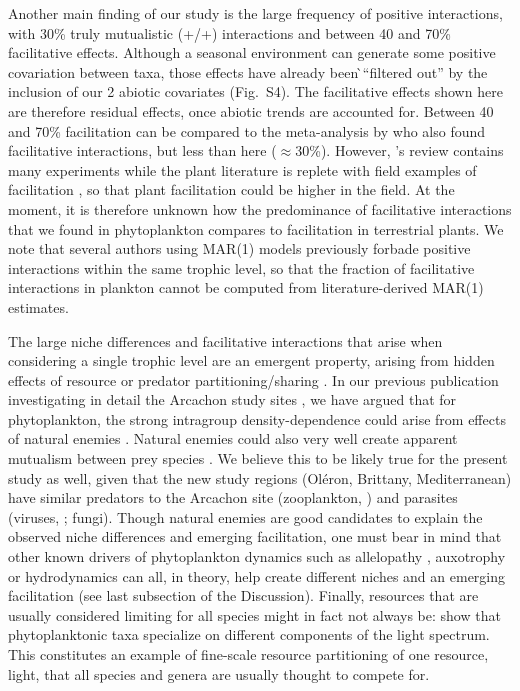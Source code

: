 \documentclass[10pt]{article}
\begin{document}
Another main finding of our study is the large frequency of positive
interactions, with 30\% truly mutualistic (+/+) interactions and between
40 and 70\% facilitative effects. Although a seasonal environment can generate some positive covariation between taxa, those effects have already been ̀``filtered out'' by the inclusion of our 2 abiotic covariates (Fig.~S4). The facilitative effects shown here are therefore residual effects, once abiotic trends are accounted for. Between 40 and 70\% facilitation can be compared to the
meta-analysis by \citet{adler_competition_2018} who also found facilitative
interactions, but less than here ($\approx$30\%). However, \citet{adler_competition_2018}'s
review contains many experiments while the plant literature is replete
with field examples of facilitation \citep{brooker_facilitation_2008,mcintire2014facilitation},
so that plant facilitation could be higher in the field. At the moment,
it is therefore unknown how the predominance of facilitative interactions
that we found in phytoplankton compares to facilitation in terrestrial
plants. We note that several authors using MAR(1) models previously
forbade positive interactions within the same trophic level, so that
the fraction of facilitative interactions in plankton cannot be computed
from literature-derived MAR(1) estimates.

The large niche differences and facilitative interactions that arise
when considering a single trophic level are an emergent property,
arising from hidden effects of resource or predator partitioning/sharing
\citep{chesson_updates_2018}. In our previous publication investigating
in detail the Arcachon study sites \citep{barraquand_coastal_2018},
we have argued that for phytoplankton, the strong intragroup density-dependence
could arise from effects of natural enemies \citep{haydon_pivotal_1994}.
Natural enemies could also very well create apparent mutualism between
prey species \citep{abrams_apparent_1998,barraquand_indirect_2015,de_ruiter_emergent_2017}.
We believe this to be likely true for the present study as well, given
that the new study regions (Oléron, Brittany, Mediterranean) have
similar predators to the Arcachon site (zooplankton, \citealp[e.g.,][]{jamet_zooplankton_2001,moderan_zooplankton_2010,tortajada_network_2012})
and parasites (viruses, \citealp[e.g.,][]{ory_pelagic_2010};
fungi). Though natural enemies are good candidates to explain the
observed niche differences and emerging facilitation, one must bear
in mind that other known drivers of phytoplankton dynamics such as
allelopathy \citep{felpeto_allelopathy_2018}, auxotrophy \citep{tang_most_2010}
or hydrodynamics \citep{levy_role_2018} can all, in theory, help
create different niches and an emerging facilitation (see last subsection
of the Discussion). Finally, resources that are usually considered
limiting for all species might in fact not always be: \citet{burson_competition_2018} show that phytoplanktonic taxa specialize on different components of the light spectrum. This constitutes an example of fine-scale resource partitioning of one resource,
light, that all species and genera are usually thought to compete for.
\end{document}
